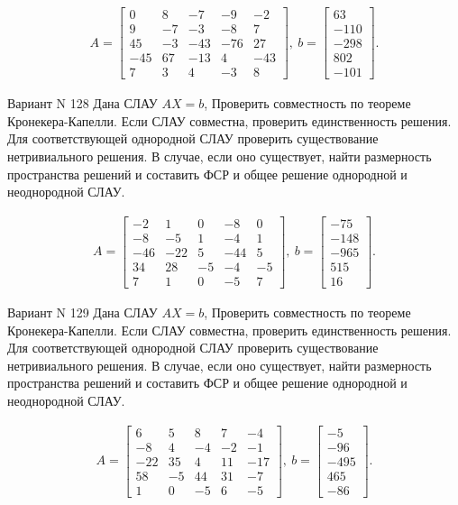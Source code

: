 \documentclass[11pt]{report}
\begin{document}
\begin{align*}
 A = \left[\begin{matrix}0 & 8 & -7 & -9 & -2\\9 & -7 & -3 & -8 & 7\\45 & -3 & -43 & -76 & 27\\-45 & 67 & -13 & 4 & -43\\7 & 3 & 4 & -3 & 8\end{matrix}\right],
\ b = \left[\begin{matrix}63\\-110\\-298\\802\\-101\end{matrix}\right]. 
 \end{align*}

Вариант N 128
Дана СЛАУ $AX = b$,
Проверить совместность по теореме Кронекера-Капелли. Если СЛАУ совместна, проверить единственность решения.
Для соответствующей однородной СЛАУ проверить существование нетривиального решения. В случае, если оно существует,
найти размерность пространства решений и составить ФСР и общее решение однородной  и неоднородной СЛАУ.


\begin{align*}
 A = \left[\begin{matrix}-2 & 1 & 0 & -8 & 0\\-8 & -5 & 1 & -4 & 1\\-46 & -22 & 5 & -44 & 5\\34 & 28 & -5 & -4 & -5\\7 & 1 & 0 & -5 & 7\end{matrix}\right],
\ b = \left[\begin{matrix}-75\\-148\\-965\\515\\16\end{matrix}\right]. 
 \end{align*}

Вариант N 129
Дана СЛАУ $AX = b$,
Проверить совместность по теореме Кронекера-Капелли. Если СЛАУ совместна, проверить единственность решения.
Для соответствующей однородной СЛАУ проверить существование нетривиального решения. В случае, если оно существует,
найти размерность пространства решений и составить ФСР и общее решение однородной  и неоднородной СЛАУ.


\begin{align*}
 A = \left[\begin{matrix}6 & 5 & 8 & 7 & -4\\-8 & 4 & -4 & -2 & -1\\-22 & 35 & 4 & 11 & -17\\58 & -5 & 44 & 31 & -7\\1 & 0 & -5 & 6 & -5\end{matrix}\right],
\ b = \left[\begin{matrix}-5\\-96\\-495\\465\\-86\end{matrix}\right]. 
 \end{align*}
\end{document}

